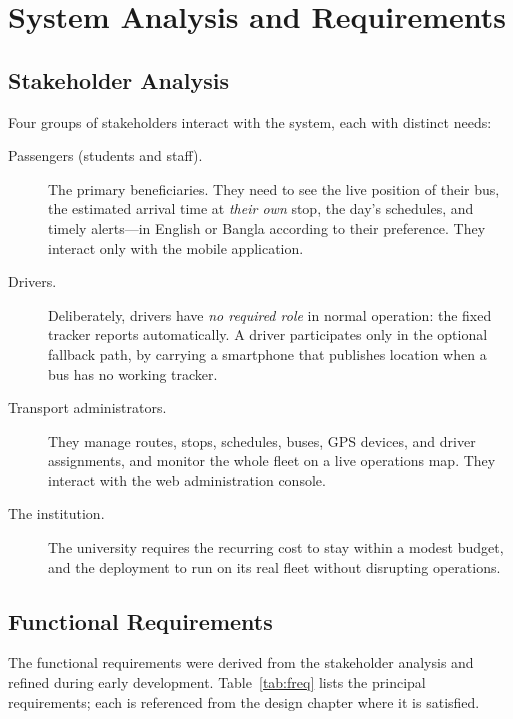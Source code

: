 \chapter{System Analysis and Requirements}
\label{ch:analysis}

\section{Stakeholder Analysis}
Four groups of stakeholders interact with the system, each with distinct
needs:

\begin{description}
  \item[Passengers (students and staff).] The primary beneficiaries. They
  need to see the live position of their bus, the estimated arrival time
  at \emph{their own} stop, the day's schedules, and timely alerts---in
  English or Bangla according to their preference. They interact only
  with the mobile application.
  \item[Drivers.] Deliberately, drivers have \emph{no required role} in
  normal operation: the fixed tracker reports automatically. A driver
  participates only in the optional fallback path, by carrying a
  smartphone that publishes location when a bus has no working tracker.
  \item[Transport administrators.] They manage routes, stops, schedules,
  buses, GPS devices, and driver assignments, and monitor the whole fleet
  on a live operations map. They interact with the web administration
  console.
  \item[The institution.] The university requires the recurring cost to
  stay within a modest budget, and the deployment to run on its real
  fleet without disrupting operations.
\end{description}

\section{Functional Requirements}
The functional requirements were derived from the stakeholder analysis
and refined during early development. Table~\ref{tab:freq} lists the
principal requirements; each is referenced from the design chapter where
it is satisfied.

